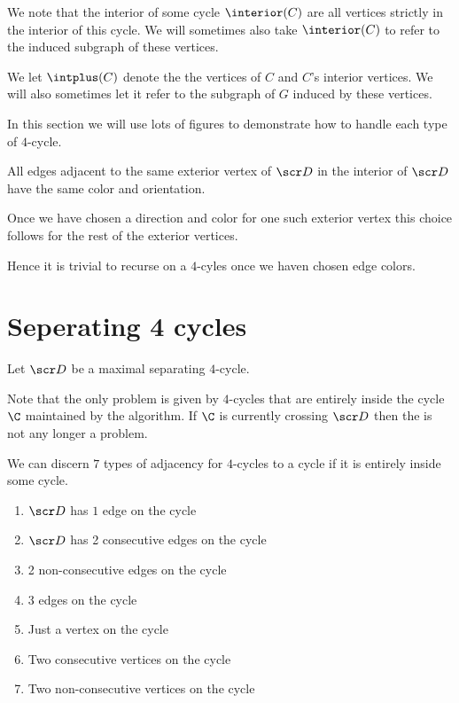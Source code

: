 
\newcommand{\D}{\scr D}


We note that the interior of some cycle $\interior(C)$ are all vertices strictly in the interior of this cycle. We will sometimes also take $\interior(C)$ to refer to the induced subgraph of these vertices.

We let $\intplus(C)$ denote the the vertices of $C$ and $C$'s interior vertices. We will also sometimes let it refer to the subgraph of $G$ induced by these vertices.


In this section we will use lots of figures to demonstrate how to handle each type of $4$-cycle.

All edges adjacent to the same exterior vertex of $\D$ in the interior of $\D$ have the same color and orientation.

Once we have chosen a direction and color for one such exterior vertex this choice follows for the rest of the exterior vertices.

Hence it is trivial to recurse on a $4$-cyles once we haven chosen edge colors.

\section{Seperating 4 cycles}
Let $\D$ be a maximal separating $4$-cycle.

Note that the only problem is given by $4$-cycles that are entirely inside the cycle $\C$ maintained by the algorithm. If $\C$ is currently crossing $\D$ then the is not any longer a problem.

We can discern $7$ types of adjacency for $4$-cycles to a cycle if it is entirely inside some cycle.
\begin{enumerate}
  \renewcommand*{\labelenumi}{(\alph{enumi})}%
  \renewcommand*{\theenumi}{(\alph{enumi})}%

  \item $\D$ has $1$ edge on the cycle
  \label{t:1}
  \item $\D$ has 2 consecutive edges on the cycle
  \label{t:2cons}
  \item 2 non-consecutive edges on the cycle
  \label{t:2alt}
  \item 3 edges on the cycle
  \label{t:3}
  \item Just a vertex on the cycle
  \label{t:v1}
  \item Two consecutive vertices on the cycle
  \label{t:v2cons}
  \item Two non-consecutive vertices on the cycle
  \label{t:v2alt}
\end{enumerate}

